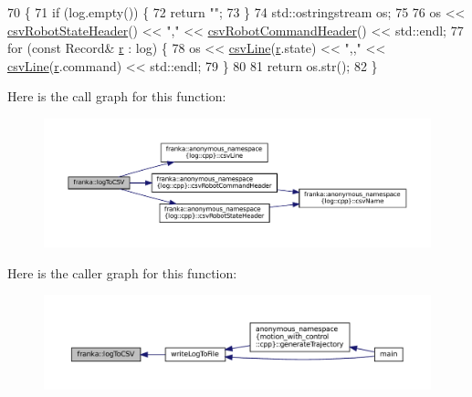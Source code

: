\begin{DoxyCode}
70                                                  \{
71   \textcolor{keywordflow}{if} (log.empty()) \{
72     \textcolor{keywordflow}{return} \textcolor{stringliteral}{""};
73   \}
74   std::ostringstream os;
75 
76   os << \hyperlink{namespacefranka_1_1anonymous__namespace_02log_8cpp_03_a6de657d62964bab6ee389fd7be7b639f}{csvRobotStateHeader}() << \textcolor{stringliteral}{","} << \hyperlink{namespacefranka_1_1anonymous__namespace_02log_8cpp_03_a2d7829c373ff68580a65cc5a48a2fd32}{csvRobotCommandHeader}() << 
      std::endl;
77   \textcolor{keywordflow}{for} (\textcolor{keyword}{const} Record& \hyperlink{namespacefake__cube__perception__node_a36e88703ab69fd35065e8a8d9344903e}{r} : log) \{
78     os << \hyperlink{namespacefranka_1_1anonymous__namespace_02log_8cpp_03_afc6faaf6d9388a97c26970a3f0fbf976}{csvLine}(\hyperlink{namespacefake__cube__perception__node_a36e88703ab69fd35065e8a8d9344903e}{r}.state) << \textcolor{stringliteral}{",,"} << \hyperlink{namespacefranka_1_1anonymous__namespace_02log_8cpp_03_afc6faaf6d9388a97c26970a3f0fbf976}{csvLine}(\hyperlink{namespacefake__cube__perception__node_a36e88703ab69fd35065e8a8d9344903e}{r}.command) << std::endl;
79   \}
80 
81   \textcolor{keywordflow}{return} os.str();
82 \}
\end{DoxyCode}
Here is the call graph for this function\+:
\nopagebreak
\begin{figure}[H]
\begin{center}
\leavevmode
\includegraphics[width=350pt]{namespacefranka_a01fbdb37b0e6beb04ba108d5f5024fd9_cgraph}
\end{center}
\end{figure}
Here is the caller graph for this function\+:
\nopagebreak
\begin{figure}[H]
\begin{center}
\leavevmode
\includegraphics[width=350pt]{namespacefranka_a01fbdb37b0e6beb04ba108d5f5024fd9_icgraph}
\end{center}
\end{figure}
\mbox{\label{namespacefranka_a94c21b0e87afce0147a9cd6025c239ca}} 
